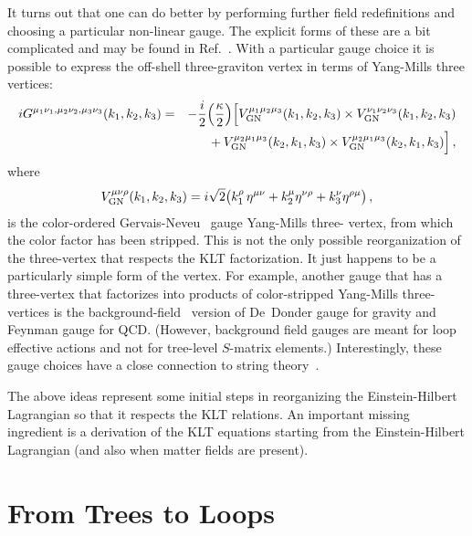 \documentclass[12pt]{livrev}
\begin{document}
It turns out that one can do better by performing further field
redefinitions and choosing a particular non-linear gauge.  The
explicit forms of these are a bit complicated and may be found in
Ref.~\cite{BernGrant}.  With a particular gauge choice it is possible
to express the off-shell three-graviton vertex in terms of Yang-Mills
three vertices:
%
\begin{eqnarray}
i G^{\mu_1 \nu_1, \mu_2\nu_2, \mu_3\nu_3}(k_1, k_2 , k_3)
& = &- {i \over 2} 
\Bigl( {\kappa \over 2} \Bigr)
\Bigl[
V_{\rm GN}^{\mu_1 \mu_2 \mu_3}(k_1, k_2, k_3) 
\times V_{\rm GN}^{\nu_1 \nu_2 \nu_3}(k_1, k_2, k_3) \nonumber \\
&&  \null
+ V_{\rm GN}^{\mu_2 \mu_1 \mu_3}(k_2, k_1, k_3) \times 
  V_{\rm GN}^{\mu_2 \mu_1 \mu_3}(k_2, k_1, k_3) \Bigr]\,, 
\label{BernGrantVertex}
\end{eqnarray}
%
where
%
\begin{equation}
 V^{\mu\nu\rho}_{\rm GN}(k_1,k_2,k_3) = 
       i\sqrt{2}  \bigl( k_1^\rho \, \eta^{\mu\nu}
            + k_2^\mu \eta^{\nu\rho} + k_3^\nu \eta^{\rho\mu} \bigr)\,,
\end{equation}
%
is the color-ordered Gervais-Neveu~\cite{GN} gauge Yang-Mills three-
vertex, from which the color factor has been stripped.  This is not
the only possible reorganization of the three-vertex that respects
the KLT factorization.  It just happens to be a particularly simple
form of the vertex.  For example, another gauge that has a three-vertex 
that factorizes into products of color-stripped Yang-Mills
three-vertices is the
background-field~\cite{tHooft75,DeWitt81,Background} version of
De~Donder gauge for gravity and Feynman gauge for QCD.  (However,
background field gauges are meant for loop effective actions and not
for tree-level $S$-matrix elements.)  Interestingly, these gauge
choices have a close connection to string theory~\cite{GN,Mapping}.

The above ideas represent some initial steps in reorganizing the
Einstein-Hilbert Lagrangian so that it respects the KLT relations.  An
important missing ingredient is a derivation of the KLT equations
starting from the Einstein-Hilbert Lagrangian (and also when matter
fields are present).

\newpage

\section{From Trees to Loops}
\label{section:trees_to_loops}
\end{document}
